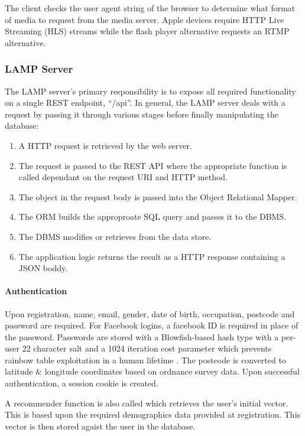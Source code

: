 The client checks the user agent string of the browser to determine what format of media to request from the media server. Apple devices require HTTP Live Streaming (HLS) streams while the flash player alternative requests an RTMP alternative.

\subsubsection{LAMP Server}

The LAMP server's primary responsibility is to expose all required functionality on a single REST endpoint, ``/api''. In general, the LAMP server deals with a request by passing it through various stages before finally manipulating the database:

\begin{enumerate}
	\item A HTTP request is retrieved by the web server.
	\item The request is passed to the REST API where the appropriate function is called dependant on the request URI and HTTP method.
	\item The object in the request body is passed into the Object Relational Mapper.
	\item The ORM builds the approproate SQL query and passes it to the DBMS.
	\item The DBMS modifies or retrieves from the data store.
	\item The application logic returns the result as a HTTP response containing a JSON boddy.
\end{enumerate}

\paragraph{Authentication}

Upon registration, name, email, gender, date of birth, occupation, postcode and password are required. For Facebook logins, a facebook ID is required in place of the password. Passwords are stored with a Blowfish-based hash type with a per-user 22 character salt and a 1024 iteration cost parameter which prevents rainbow table exploitation in a human lifetime \citep{hashing}. The postcode is converted to latitude \& longitude coordinates based on ordnance survey data. Upon successful authentication, a session cookie is created.

A recommender function is also called which retrieves the user's initial vector. This is based upon the required demographics data provided at registration. This vector is then stored agaist the user in the database.

